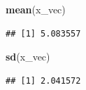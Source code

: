 \documentclass[11pt,]{article}
\newenvironment{Shaded}{\begin{snugshade}}{\end{snugshade}}
\newcommand{\KeywordTok}[1]{\textcolor[rgb]{0.13,0.29,0.53}{\textbf{#1}}}
\newcommand{\NormalTok}[1]{#1}
\begin{document}
\begin{Shaded}
\begin{Highlighting}[]
\KeywordTok{mean}\NormalTok{(x_vec)}
\end{Highlighting}
\end{Shaded}

\begin{verbatim}
## [1] 5.083557
\end{verbatim}

\begin{Shaded}
\begin{Highlighting}[]
\KeywordTok{sd}\NormalTok{(x_vec)}
\end{Highlighting}
\end{Shaded}

\begin{verbatim}
## [1] 2.041572
\end{verbatim}
\end{document}
